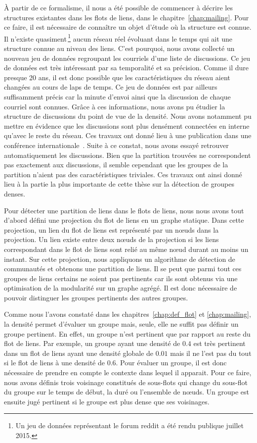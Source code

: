 \`A partir de ce formalisme, il nous a été possible de commencer à décrire les structures existantes dans les flots de liens, dans le chapitre~\ref{chap:mailing}.
Pour ce faire, il est nécessaire de connaître un objet d'étude où la structure est connue.
Il n'existe quasiment\,\footnote{Un jeu de données représentant le forum reddit a été rendu publique juillet 2015.} aucun réseau réel évoluant dans le temps qui ait une structure connue au niveau des liens.
C'est pourquoi, nous avons collecté un nouveau jeu de données regroupant les courriels d'une liste de discussions.
Ce jeu de données est très intéressant par sa temporalité et sa précision.
Comme il dure presque 20 ans, il est donc possible que les caractéristiques du réseau aient changées au cours de laps de temps.
Ce jeu de données est par ailleurs suffisamment précis car la minute d’envoi ainsi que la discussion de chaque courriel sont connues.
Grâce à ces informations, nous avons pu étudier la structure de discussions du point de vue de la densité.
Nous avons notamment pu mettre en évidence que les discussions sont plus densément connectées en interne qu'avec le reste du réseau.
Ces travaux ont donné lieu à une publication dans une conférence internationale~\cite{Gaumont2016}.
Suite à ce constat, nous avons essayé retrouver automatiquement les discussions.
Bien que la partition trouvées ne correspondent pas exactement aux discussions, il semble cependant que les groupes de la partition n'aient pas des caractéristiques triviales.
Ces travaux ont ainsi donné lieu à la partie la plus importante de cette thèse sur la détection de groupes denses.

\bigskip

Pour détecter une partition de liens dans le flots de liens, nous nous avons tout d'abord défini une projection du flot de liens en un graphe statique.
Dans cette projection, un lien du flot de liens est représenté par un n\oe uds dans la projection.
Un lien existe entre deux n\oe uds de la projection si les liens correspondant dans le flot de liens sont relié au même n\oe ud durant au moins un instant.
Sur cette projection, nous appliquons un algorithme de détection de communautés et obtenons une partition de liens.
Il se peut que parmi tout ces groupes de liens certains ne soient pas pertinents car ils sont obtenus via une optimisation de la modularité sur un graphe agrégé.
Il est donc nécessaire de pouvoir distinguer les groupes pertinents des autres groupes.


Comme nous l'avons constaté dans les chapitres~\ref{chap:def_flot} et \ref{chap:mailing}, la densité permet d'évaluer un groupe mais, seule, elle ne suffit pas définir un groupe pertinent.
En effet, un groupe n'est pertinent que par rapport au reste du flot de liens.
Par exemple, un groupe ayant une densité de $0.4$ est très pertinent dans un flot de liens ayant une densité globale de $0.01$ mais il ne l'est pas du tout si le flot de liens à une densité de $0.6$.
Pour évaluer un groupe, il est donc nécessaire de prendre en compte le contexte dans lequel il apparait.
Pour ce faire, nous avons définis trois voisinage constitués de sous-flots qui change du sous-flot du groupe sur le temps de début, la duré ou l'ensemble de n\oe uds.
Un groupe est ensuite jugé pertinent si le groupe est plus dense que ses voisinages.

